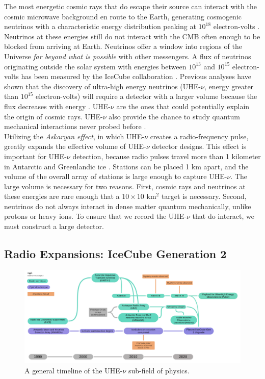 \documentclass[../../../main.tex]{subfiles}
\begin{document}
The most energetic cosmic rays that do escape their source can interact with the cosmic microwave background en route to the Earth, generating cosmogenic neutrinos with a characteristic energy distribution peaking at $10^{18}$ electron-volts \cite{10.1007/bf00645585} \cite{BERESINSKY1969423}.  Neutrinos at these energies still do not interact with the CMB often enough to be blocked from arriving at Earth.  Neutrinos offer a window into regions of the Universe \textit{far beyond what is possible} with other messengers.  A flux of neutrinos originating outside the solar system with energies between $10^{13}$ and $10^{15}$ electron-volts has been measured by the IceCube collaboration \cite{PhysRevLett.111.021103}. Previous analyses have shown that the discovery of ultra-high energy neutrinos (UHE-$\nu$, energy greater than $10^{15}$ electron-volts) will require a detector with a larger volume because the flux decreases with energy \cite{PhysRevD.98.062003}. UHE-$\nu$ are the ones that could potentially explain the origin of cosmic rays.  UHE-$\nu$ also provide the chance to study quantum mechanical interactions never probed before \cite{Astro2020_1} \cite{Astro2020_2}.
\\
\vspace{0.15cm}
Utilizing the \textit{Askaryan effect}, in which UHE-$\nu$ creates a radio-frequency pulse, greatly expands the effective volume of UHE-$\nu$ detector designs.  This effect is important for UHE-$\nu$ detection, because radio pulses travel more than 1 kilometer in Antarctic and Greenlandic ice \cite{10.3189/2015jog14j214} \cite{10.3189/2015jog15j057} \cite{10.1002/2015rs005849} \cite{10.1016/j.astropartphys.2011.11.010}.  Stations can be placed 1 km apart, and the volume of the overall array of stations is large enough to capture UHE-$\nu$.  The large volume is necessary for two reasons.  First, cosmic rays and neutrinos at these energies are rare enough that a $10 \times 10$ km$^2$ target is necessary.  Second, neutrinos do not always interact in dense matter quantum mechanically, unlike protons or heavy ions.  To ensure that we record the UHE-$\nu$ that do interact, we must construct a large detector.

\subsection{Radio Expansions: IceCube Generation 2}
\label{sec:gen2}

\begin{figure}
\centering
\includegraphics[width=\textwidth]{figures/timeline.pdf}
\caption{\label{fig:flow} A general timeline of the UHE-$\nu$ sub-field of physics.}
\end{figure}
\end{document}
